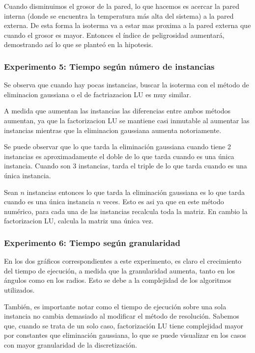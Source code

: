     Cuando disminuimos el grosor de la pared, lo que hacemos es acercar la pared interna (donde se encuentra la temperatura más alta del sistema) a la pared externa. De esta forma la isoterma va a estar mas proxima a la pared externa que cuando el grosor es mayor. Entonces el índice de peligrosidad aumentará, demostrando así lo que se planteó en la hipotesis.
    
  \subsubsection*{Experimento 5: Tiempo según número de instancias}
    Se observa que cuando hay pocas instancias, buscar la isoterma con el método de eliminacion gaussiana o el de factriazacion LU es muy similar.

    A medida que aumentan las instancias las diferencias entre ambos métodos aumentan, ya que la factorizacion LU se mantiene casi inmutable al aumentar las instancias mientras que la eliminacion gaussiana aumenta notoriamente.

    Se puede observar que lo que tarda la eliminación gaussiana cuando tiene 2 instancias es aproximadamente el doble de lo que tarda cuando es una única instancia. Cuando son 3 instancias, tarda el triple de lo que tarda cuando es una única instancia. 

    Sean $n$ instancias entonces lo que tarda la eliminación gaussiana es lo que tarda cuando es una única instancia $n$ veces. Esto es asi ya que en este método numérico, para cada una de las instancias recalcula toda la matriz. En cambio la factorizacion LU, calcula la matriz una única vez.

  \subsubsection*{Experimento 6: Tiempo según granularidad}
    En los dos gráficos correspondientes a este experimento, es claro el crecimiento del tiempo de ejecución, a medida que la granularidad aumenta, tanto en los ángulos como en los radios. Esto se debe a la complejidad de los algoritmos utilizados.

    También, es importante notar como el tiempo de ejecución sobre una sola instancia no cambia demasiado al modificar el método de resolución. Sabemos que, cuando se trata de un solo caso, factorización LU tiene complejidad mayor por constantes que eliminación gaussiana, lo que se puede visualizar en los casos con mayor granularidad de la discretización.

